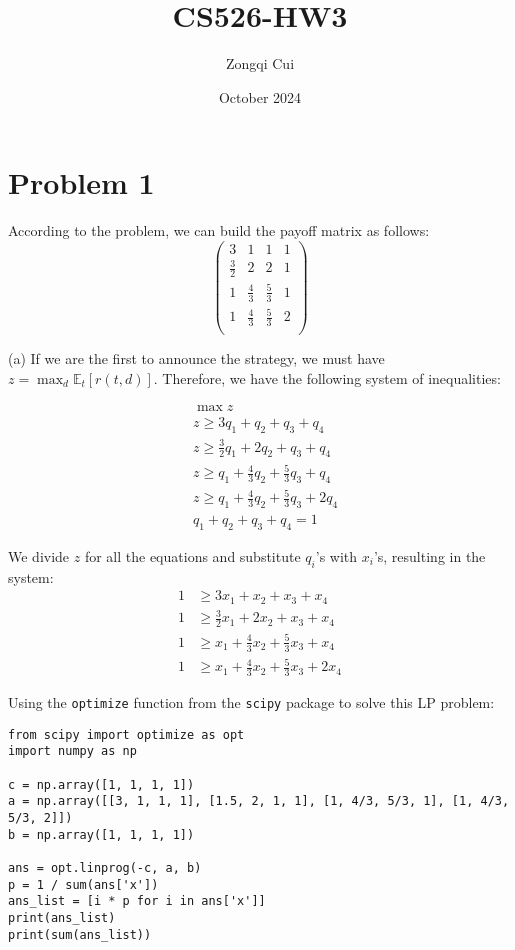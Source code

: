 \documentclass{article}
\title{CS526-HW3}
\author{Zongqi Cui}
\date{October 2024}
\begin{document}
\maketitle

\section*{Problem 1}

According to the problem, we can build the payoff matrix as follows:
\[
\begin{pmatrix}
3 & 1 & 1 & 1 \\
\frac{3}{2}  & 2 & 2 & 1 \\
1 & \frac{4}{3} & \frac{5}{3} & 1 \\
1 & \frac{4}{3} & \frac{5}{3} & 2 \\
\end{pmatrix}
\]

(a) If we are the first to announce the strategy, we must have \( z = \max_d \mathbb{E}_t[r(t, d)] \). Therefore, we have the following system of inequalities:

\[
\begin{aligned}
&\max z \\
& z \geq 3q_1 + q_2 + q_3 + q_4 \\
& z \geq \frac{3}{2}q_1 + 2q_2 + q_3 + q_4 \\
& z \geq q_1 + \frac{4}{3}q_2 + \frac{5}{3}q_3 + q_4 \\
& z \geq q_1 + \frac{4}{3}q_2 + \frac{5}{3}q_3 + 2q_4 \\
& q_1 + q_2 + q_3 + q_4 = 1
\end{aligned}
\]

We divide \( z \) for all the equations and substitute \( q_i \)'s with \( x_i \)'s, resulting in the system:
\[
\begin{aligned}
1 &\geq 3x_1 + x_2 + x_3 + x_4 \\
1 &\geq \frac{3}{2}x_1 + 2x_2 + x_3 + x_4 \\
1 &\geq x_1 + \frac{4}{3}x_2 + \frac{5}{3}x_3 + x_4 \\
1 &\geq x_1 + \frac{4}{3}x_2 + \frac{5}{3}x_3 + 2x_4
\end{aligned}
\]

Using the \texttt{optimize} function from the \texttt{scipy} package to solve this LP problem:

\begin{verbatim}
from scipy import optimize as opt
import numpy as np

c = np.array([1, 1, 1, 1])
a = np.array([[3, 1, 1, 1], [1.5, 2, 1, 1], [1, 4/3, 5/3, 1], [1, 4/3, 5/3, 2]])
b = np.array([1, 1, 1, 1])

ans = opt.linprog(-c, a, b)
p = 1 / sum(ans['x'])
ans_list = [i * p for i in ans['x']]
print(ans_list)
print(sum(ans_list))
\end{verbatim}
\end{document}
